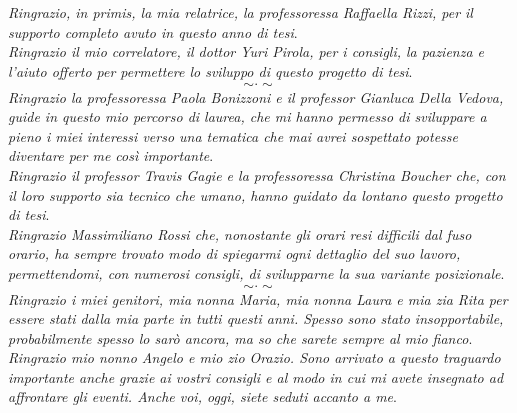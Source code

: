 \chapter*{}
\vspace{-3cm}

\thispagestyle{empty}

\begin{flushleft}
  \textit{Ringrazio, in primis, la mia relatrice, la professoressa Raffaella
    Rizzi, per il supporto completo avuto in questo anno di tesi}.\\
  \vspace{2mm}
  \textit{Ringrazio il mio correlatore, il dottor Yuri Pirola, per i consigli,
    la pazienza e l'aiuto offerto per permettere lo sviluppo di questo progetto
    di tesi}.%
  \[\sim\cdot\sim\]
  \textit{Ringrazio la professoressa Paola Bonizzoni e il professor Gianluca
    Della Vedova, guide in questo mio percorso di laurea, che mi hanno permesso
    di sviluppare a pieno i miei interessi verso una tematica che mai avrei
    sospettato potesse diventare per me così importante}.\\
  \vspace{2mm}
  \textit{Ringrazio il professor Travis Gagie e la professoressa Christina
    Boucher che, con il loro supporto 
    sia tecnico che umano, hanno guidato da lontano questo progetto di tesi}.\\
  \vspace{2mm}
  \textit{Ringrazio Massimiliano Rossi che, nonostante gli orari resi difficili
    dal fuso orario, ha sempre trovato modo di spiegarmi ogni dettaglio del suo
    lavoro, permettendomi, con numerosi consigli, di svilupparne la sua variante 
    posizionale}.  
  \[\sim\cdot\sim\]
  \textit{Ringrazio i miei genitori, mia nonna Maria, mia nonna Laura e mia zia
    Rita per essere stati dalla mia parte in tutti questi anni. Spesso sono
    stato insopportabile, probabilmente spesso lo sarò ancora, ma so che sarete
    sempre al mio fianco}.\\
  \vspace{2mm}
  \textit{Ringrazio mio nonno Angelo e mio zio Orazio. Sono
    arrivato a questo traguardo importante anche grazie ai vostri consigli e al
    modo in cui mi avete insegnato ad affrontare gli eventi. Anche voi, oggi,
    siete seduti accanto a me}.

\end{flushleft}
